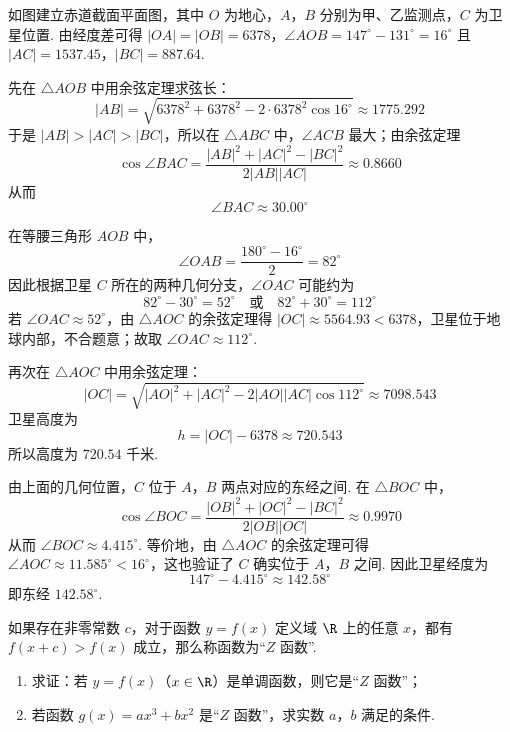 \begin{solution}
如图建立赤道截面平面图，其中 \(O\) 为地心，\(A\)，\(B\) 分别为甲、乙监测点，\(C\) 为卫星位置. 由经度差可得
\(|OA|=|OB|=6378\)，\(\angle AOB=147^\circ-131^\circ=16^\circ\)
且
\(|AC|=1537.45\)，\(|BC|=887.64\).


先在 \(\triangle AOB\) 中用余弦定理求弦长：
\[
|AB|=\sqrt{6378^2+6378^2-2\cdot6378^2\cos16^\circ}
\approx1775.292
\]
于是 \(|AB|>|AC|>|BC|\)，所以在 \(\triangle ABC\) 中，\(\angle ACB\) 最大；由余弦定理
\[
\cos\angle BAC
=\frac{|AB|^2+|AC|^2-|BC|^2}{2|AB||AC|}
\approx0.8660
\]
从而
\[
\angle BAC\approx30.00^\circ
\]

在等腰三角形 \(AOB\) 中，
\[
\angle OAB=\frac{180^\circ-16^\circ}{2}=82^\circ
\]
因此根据卫星 \(C\) 所在的两种几何分支，\(\angle OAC\) 可能约为
\[
82^\circ-30^\circ=52^\circ
\quad\text{或}\quad
82^\circ+30^\circ=112^\circ
\]
若 \(\angle OAC\approx52^\circ\)，由 \(\triangle AOC\) 的余弦定理得 \(|OC|\approx5564.93<6378\)，卫星位于地球内部，不合题意；故取 \(\angle OAC\approx112^\circ\).

再次在 \(\triangle AOC\) 中用余弦定理：
\[
|OC|
=\sqrt{|AO|^2+|AC|^2-2|AO||AC|\cos112^\circ}
\approx7098.543
\]
卫星高度为
\[
h=|OC|-6378\approx720.543
\]
所以高度为 \(720.54\text{ 千米}\).

由上面的几何位置，\(C\) 位于 \(A\)，\(B\) 两点对应的东经之间. 在 \(\triangle BOC\) 中，
\[
\cos\angle BOC
=\frac{|OB|^2+|OC|^2-|BC|^2}{2|OB||OC|}
\approx0.9970
\]
从而 \(\angle BOC\approx4.415^\circ\). 等价地，由 \(\triangle AOC\) 的余弦定理可得 \(\angle AOC\approx11.585^\circ<16^\circ\)，这也验证了 \(C\) 确实位于 \(A\)，\(B\) 之间. 因此卫星经度为
\[
147^\circ-4.415^\circ\approx142.58^\circ
\]
即东经 \(142.58^\circ\).
\end{solution}

\begin{problem}
如果存在非零常数 \(c\)，对于函数 \(y=f(x)\) 定义域 \(\R\) 上的任意 \(x\)，都有 \(f(x+c)>f(x)\) 成立，那么称函数为“\(Z\) 函数”.

\begin{enumerate}
\item 求证：若 \(y=f(x)\)（\(x\in\R\)）是单调函数，则它是“\(Z\) 函数”；
\item 若函数 \(g(x)=ax^{3}+bx^{2}\) 是“\(Z\) 函数”，求实数 \(a\)，\(b\) 满足的条件.
\end{enumerate}
\end{problem}

